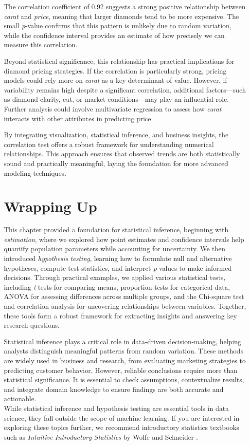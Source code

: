 \documentclass[
  11pt,
]{book}
\theoremstyle{definition}
\theoremstyle{definition}
\theoremstyle{definition}
\theoremstyle{definition}
\theoremstyle{remark}
\begin{document}
The correlation coefficient of 0.92 suggests a strong positive relationship between \emph{carat} and \emph{price}, meaning that larger diamonds tend to be more expensive. The small \emph{p}-value confirms that this pattern is unlikely due to random variation, while the confidence interval provides an estimate of how precisely we can measure this correlation.

Beyond statistical significance, this relationship has practical implications for diamond pricing strategies. If the correlation is particularly strong, pricing models could rely more on \emph{carat} as a key determinant of value. However, if variability remains high despite a significant correlation, additional factors---such as diamond clarity, cut, or market conditions---may play an influential role. Further analysis could involve multivariate regression to assess how \emph{carat} interacts with other attributes in predicting price.

By integrating visualization, statistical inference, and business insights, the correlation test offers a robust framework for understanding numerical relationships. This approach ensures that observed trends are both statistically sound and practically meaningful, laying the foundation for more advanced modeling techniques.

\section{Wrapping Up}\label{wrapping-up}

This chapter provided a foundation for statistical inference, beginning with \emph{estimation}, where we explored how point estimates and confidence intervals help quantify population parameters while accounting for uncertainty. We then introduced \emph{hypothesis testing}, learning how to formulate null and alternative hypotheses, compute test statistics, and interpret \emph{p}-values to make informed decisions. Through practical examples, we applied various statistical tests, including \emph{t}-tests for comparing means, proportion tests for categorical data, ANOVA for assessing differences across multiple groups, and the Chi-square test and correlation analysis for uncovering relationships between variables. Together, these tools form a robust framework for extracting insights and answering key research questions.

Statistical inference plays a critical role in data-driven decision-making, helping analysts distinguish meaningful patterns from random variation. These methods are widely used in business and research, from evaluating marketing strategies to predicting customer behavior. However, reliable conclusions require more than statistical significance. It is essential to check assumptions, contextualize results, and integrate domain knowledge to ensure findings are both accurate and actionable.\\
While statistical inference and hypothesis testing are essential tools in data science, they fall outside the scope of machine learning. If you are interested in exploring these topics further, we recommend introductory statistics textbooks such as \emph{Intuitive Introductory Statistics} by Wolfe and Schneider \citep{wolfe2017intuitive}.
\end{document}
